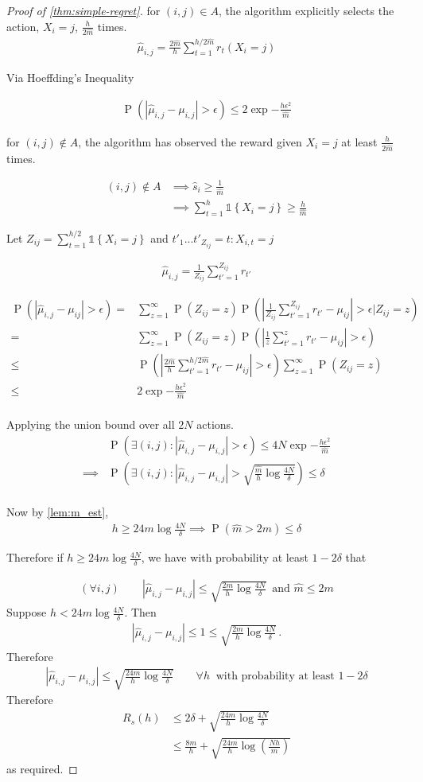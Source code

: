 \documentclass{article}
\newcommand{\set}[1]{\left\{#1\right\}}
\newcommand{\ind}[1]{\mathds{1}\!\!\set{#1}}
\newcommand{\eqn}[1]{\begin{align}#1\end{align}}
\newcommand{\eq}[1]{\begin{align*}#1\end{align*}}
\renewcommand{\P}[1]{\operatorname{P}\left(#1\right)}
\theoremstyle{plain}
\theoremstyle{definition}
\begin{document}
\begin{proof}[Proof of \cref{thm:simple-regret}]


for $(i,j)\in A$, the algorithm explicitly selects the action, $X_i = j$,  $\frac{h}{2\hat m}$ times.
\eq {
\hat \mu_{i,j} = \frac{2\hat m}{h} \sum_{t=1}^{h/2\hat m} r_t(X_i = j)
}

Via Hoeffding's Inequality

\eq {
\P{ \left|\hat \mu_{i,j} - \mu_{i,j}\right| > \epsilon } \leq 2\exp{-\frac{h\epsilon^2}{\hat{m}}}
}

for $(i,j)\notin A$, the algorithm has observed the reward given $X_i = j$ at least $\frac{h}{2\hat m}$ times.

\eq {
(i,j)\notin A & \implies \hat{s}_i \geq \frac{1}{\hat m} \\
& \implies \sum_{t=1}^h \ind{X_i = j} \geq \frac{h}{\hat{m}}
}

Let  $Z_{ij} = \sum_{t=1}^{h/2} \ind{X_i = j}$ and $t'_1 ... t'_{Z_{ij}} = {t:X_{i,t} = j}$

\eq {
\hat \mu_{i,j} = \frac{1}{Z_{ij}}\sum_{t'=1}^{Z_{ij}}r_{t'}
}


\eq {
\P{\left| \hat \mu_{i,j} - \mu_{ij} \right| > \epsilon} = & \sum_{z=1}^\infty \P{Z_{ij}=z}\P{\left| \frac{1}{Z_{ij}} \sum_{t'=1}^{Z_{ij}}r_{t'} - \mu_{ij} \right| > \epsilon | Z_{ij} = z} \\
= & \sum_{z=1}^\infty \P{Z_{ij}=z}\P{\left| \frac{1}{z} \sum_{t'=1}^{z}r_{t'} - \mu_{ij} \right| > \epsilon } \\
\leq & \P{\left| \frac{2\hat m}{h} \sum_{t'=1}^{h/2\hat m}r_{t'} - \mu_{ij} \right| > \epsilon } \sum_{z=1}^\infty \P{Z_{ij}=z} \\
\leq & 2\exp{-\frac{h\epsilon^2}{\hat{m}}}\\
}

Applying the union bound over all $2N$ actions.
\eq{
& \P{\exists (i,j): \left| \hat \mu_{i,j} - \mu_{i,j} \right| > \epsilon} \leq 4N\exp{-\frac{h\epsilon^2}{\hat{m}}} \\
\implies & \P{\exists (i,j): \left| \hat \mu_{i,j} - \mu_{i,j} \right| > \sqrt{\frac{\hat m}{h}\log{\frac{4N}{\delta}}}} \leq \delta \\
}

Now by \cref{lem:m_est}, 
\eq{
h \geq 24m \log \frac{4N}{\delta} \implies \P{\hat m > 2m} \leq \delta
} 

Therefore if $h \geq 24m \log \frac{4N}{\delta}$, we have with probability at least $1 - 2\delta$ that

\eqn{
\label{eqn:joint_bound_estimates_m}
(\forall i, j) \qquad \left|\hat \mu_{i,j} - \mu_{i,j}\right| \leq \sqrt{\frac{2m}{h} \log\frac{4N}{\delta}}\, \text { and } \hat{m} \leq 2m
}
Suppose $h < 24m \log \frac{4N}{\delta}$. Then
\eq{
\left|\hat \mu_{i,j} - \mu_{i,j}\right| \leq 1 \leq \sqrt{\frac{2m}{h} \log \frac{4N}{\delta}}\,.
}
Therefore
\eq{
\left|\hat \mu_{i,j} - \mu_{i,j}\right| \leq \sqrt{\frac{24m}{h} \log \frac{4N}{\delta}} \qquad \forall h\ \text{ with probability at least } 1-2\delta
}
Therefore 
\eq{
R_s(h) 
&\leq 2\delta + \sqrt{\frac{24m}{h} \log \frac{4N}{\delta}} \\
&\leq \frac{8m}{h} + \sqrt{\frac{24m}{h} \log \left(\frac{Nh}{m}\right)}
}
as required.
\end{proof}
\end{document}

